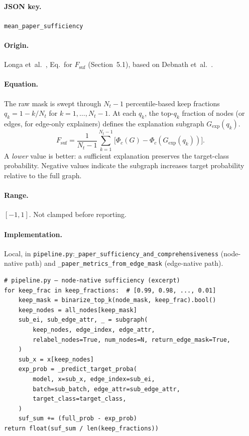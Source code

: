 \documentclass[11pt,a4paper]{article}
\newcommand{\code}[1]{\texttt{#1}}
\newcommand{\jsonkey}[1]{\texttt{#1}}
\newcommand{\model}{\Phi}
\newcommand{\Gexp}{G_{\mathrm{exp}}}
\begin{document}
\paragraph{JSON key.} \jsonkey{mean\_paper\_sufficiency}

\paragraph{Origin.} Longa et~al.~\cite{longa2025}, Eq.\ for $F_{\mathrm{suf}}$
(Section~5.1), based on Debnath et~al.~\cite{debnath2019}.

\paragraph{Equation.}
The raw mask is swept through $N_t - 1$ percentile-based keep fractions
$q_k = 1 - k/N_t$ for $k = 1, \ldots, N_t - 1$.  At each $q_k$, the top-$q_k$
fraction of nodes (or edges, for edge-only explainers) defines the explanation
subgraph $\Gexp(q_k)$.
\begin{equation}
  F_{\mathrm{suf}} = \frac{1}{N_t - 1} \sum_{k=1}^{N_t - 1}
    \bigl[\model_c(G) - \model_c(\Gexp(q_k))\bigr].
  \label{eq:fsuf}
\end{equation}
A \emph{lower} value is better: a sufficient explanation preserves the
target-class probability.  Negative values indicate the subgraph increases
target probability relative to the full graph.

\paragraph{Range.} $[-1, 1]$.  Not clamped before reporting.

\paragraph{Implementation.} Local, in
\code{pipeline.py}:\code{\_paper\_sufficiency\_and\_comprehensiveness}
(node-native path) and
\code{\_paper\_metrics\_from\_edge\_mask} (edge-native path).

\begin{verbatim}
# pipeline.py — node-native sufficiency (excerpt)
for keep_frac in keep_fractions:  # [0.99, 0.98, ..., 0.01]
    keep_mask = binarize_top_k(node_mask, keep_frac).bool()
    keep_nodes = all_nodes[keep_mask]
    sub_ei, sub_edge_attr, _ = subgraph(
        keep_nodes, edge_index, edge_attr,
        relabel_nodes=True, num_nodes=N, return_edge_mask=True,
    )
    sub_x = x[keep_nodes]
    exp_prob = _predict_target_proba(
        model, x=sub_x, edge_index=sub_ei,
        batch=sub_batch, edge_attr=sub_edge_attr,
        target_class=target_class,
    )
    suf_sum += (full_prob - exp_prob)
return float(suf_sum / len(keep_fractions))
\end{verbatim}
\end{document}
